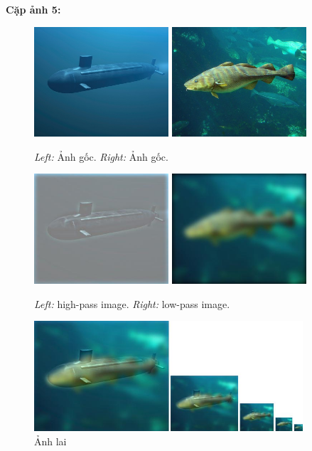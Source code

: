 \textbf{Cặp ảnh 5:}
\begin{figure}[H]
    \centering
    \includegraphics[width=5cm]{images/results_part2/fish_submarine/05_submarine.jpg}
    \includegraphics[width=5cm]{images/results_part2/fish_submarine/05_fish.jpg}
    \caption{\emph{Left:} Ảnh gốc. \emph{Right:} Ảnh gốc.}
\end{figure}

\begin{figure}[H]
    \centering
    \includegraphics[width=5cm]{images/results_part2/fish_submarine/high_frequencies.jpg}
    \includegraphics[width=5cm]{images/results_part2/fish_submarine/low_frequencies.jpg}
    \caption{\emph{Left:} high-pass image. \emph{Right:} low-pass image.}
\end{figure}
\begin{figure}[H]
    \centering
    \includegraphics[width=10cm]{images/results_part2/fish_submarine/hybrid_image_scales.jpg}
    \caption{Ảnh lai}
\end{figure}

